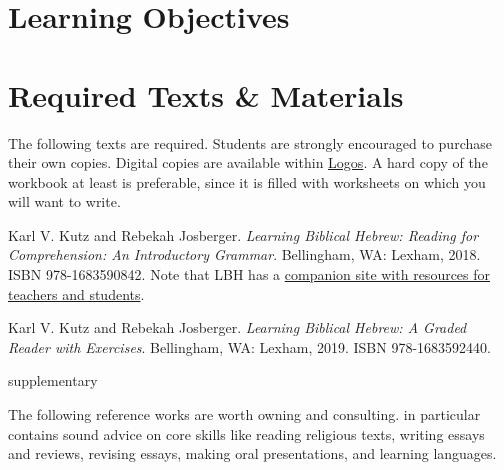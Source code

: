 \documentclass[titlepage]{article}
\newcommand\incl{../includes}
\begin{document}


  \section{Learning Objectives}
  \label{objectives}

  \edobject

\section{Required Texts \& Materials}
\label{texts}

The following texts are required. Students are strongly encouraged to
purchase their own copies. Digital copies are available within
\href{https://www.logos.com/product/177582/learning-biblical-hebrew-bundle}{Logos}.
A hard copy of the workbook at least is preferable, since it is filled
with worksheets on which you will want to write.

\begingroup
\renewcommand{\section}[2]{}%
\begin{thebibliography}{Workbook}%

    Karl V. Kutz and Rebekah Josberger.
    \emph{Learning Biblical Hebrew: Reading for Comprehension: An Introductory Grammar}.
    Bellingham, WA: Lexham, 2018. ISBN 978-1683590842.
    Note that LBH has a \href{http://www.learningbiblicalhebrew.com/}{companion site with resources for teachers and students}.

    Karl V. Kutz and Rebekah Josberger.
    \emph{Learning Biblical Hebrew: A Graded Reader with Exercises}.
    Bellingham, WA: Lexham, 2019. ISBN 978-1683592440.

\end{thebibliography}
\endgroup

\section{Supplementary Texts}
\label{supplementary}

The following reference works are worth owning and consulting.
\cite{rlgs} in particular contains sound advice on core skills like
reading religious texts, writing essays and reviews, revising essays,
making oral presentations, and learning languages.
\end{document}
